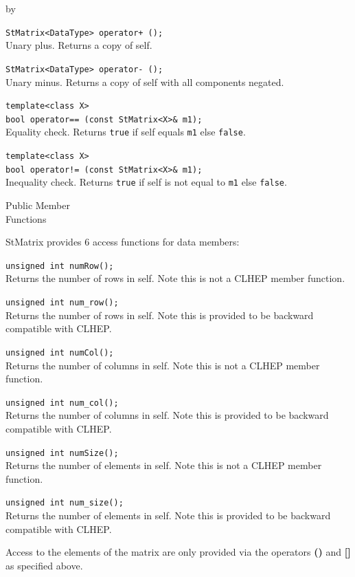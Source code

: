 \documentclass[twoside]{article}
\newcommand{\comp}[1]{\texttt{#1}}%
\newcommand{\entrylabel}[1]{\mbox{\textbf{{#1}}}\hfil}%
\newenvironment{entry}
{\begin{list}{}%
    {\renewcommand{\makelabel}{\entrylabel}%
     \setlength{\labelwidth}{90pt}%
     \setlength{\leftmargin}{\labelwidth}
     \advance\leftmargin by \labelsep%
      }%
    }%
  {\end{list}}
\newcommand{\Entrylabel}[1]%
{\raisebox{0pt}[1ex][0pt]{\makebox[\labelwidth][l]%
    {\parbox[t]{\labelwidth}{\hspace{0pt}\textbf{{#1}}}}}}
\newenvironment{Entry}%
{\renewcommand{\entrylabel}{\Entrylabel}\begin{entry}}%
  {\end{entry}}
\begin{document}
\begin{description}
\begin{Entry}
    \verb#StMatrix<DataType> operator+ ();#\\
    Unary plus. Returns a copy of self.

    \verb+StMatrix<DataType> operator- ();+\\
    Unary minus. Returns a copy of self with all components negated.
        
    \verb+template<class X>+\\
    \verb+bool operator== (const StMatrix<X>& m1);+\\
    Equality check. Returns \comp{true} if self equals
    \comp{m1} else \comp{false}.
    
    \verb+template<class X>+\\
    \verb+bool operator!= (const StMatrix<X>& m1);+\\
    Inequality check. Returns \comp{true} if self is not equal to
    \comp{m1} else \comp{false}.
    
\item[Public Member\\ Functions]

  StMatrix provides 6 access functions for data members:
  
  \verb+unsigned int numRow();+\\
  Returns the number of rows in self.  Note this is
  not a CLHEP member function.

  \verb+unsigned int num_row();+\\
  Returns the number of rows in self.  Note this is
  provided to be backward compatible with CLHEP.

  \verb+unsigned int numCol();+\\
  Returns the number of columns in self.  Note this is
  not a CLHEP member function.

  \verb+unsigned int num_col();+\\
  Returns the number of columns in self.  Note this is
  provided to be backward compatible with CLHEP.

  \verb+unsigned int numSize();+\\
  Returns the number of elements in self.  Note this is
  not a CLHEP member function.
  
  \verb+unsigned int num_size();+\\
  Returns the number of elements in self.  Note this is
  provided to be backward compatible with CLHEP.

  Access to the elements of the matrix are only provided
  via the operators {\bf ()} and {\bf []} as specified above.  


\end{Entry}
\end{description}
\end{document}
